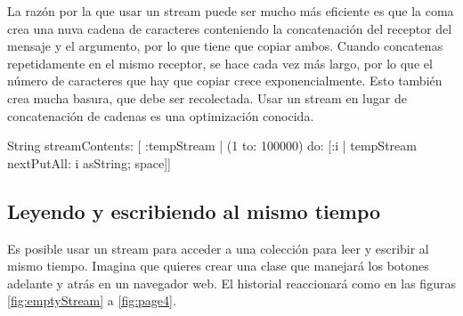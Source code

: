 \documentclass[a4paper,10pt,twoside]{book}
\begin{document}
{%
La raz\'on por la que usar un stream puede ser mucho m\'as eficiente es que la coma crea una nuva cadena de caracteres conteniendo la concatenaci\'on del receptor del mensaje y el argumento, por lo que tiene que copiar ambos.
Cuando concatenas repetidamente en el mismo receptor, se hace cada vez m\'as largo, por lo que el n\'umero de caracteres que hay que copiar crece exponencialmente. 
Esto tambi\'en crea mucha basura, que debe ser recolectada. Usar un stream en lugar de concatenaci\'on de cadenas es una optimizaci\'on conocida.


\begin{code}{}
String streamContents: [ :tempStream |
  (1 to: 100000)
       do: [:i | tempStream nextPutAll: i asString; space]] 
\end{code}

\subsection{Leyendo y escribiendo al mismo tiempo}

Es posible usar un stream para acceder a una colecci\'on para leer y escribir al mismo tiempo. 
Imagina que quieres crear una clase  que manejar\'a los botones adelante y atr\'as en un navegador web.
El historial reaccionar\'a como en las figuras \ref{fig:emptyStream} a \ref{fig:page4}.

}
\end{document}
